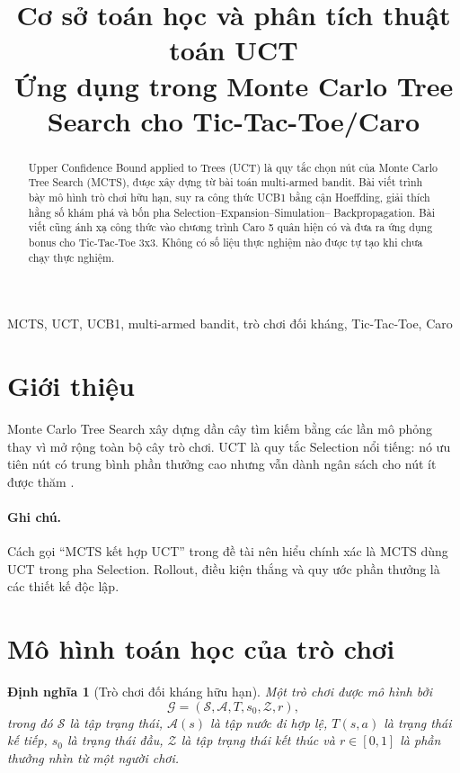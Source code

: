 \documentclass[conference]{IEEEtran}
\title{Cơ sở toán học và phân tích thuật toán UCT\\
\large Ứng dụng trong Monte Carlo Tree Search cho Tic-Tac-Toe/Caro}
\author{\IEEEauthorblockN{Tên sinh viên}
\IEEEauthorblockA{Bộ môn Trí tuệ nhân tạo\\
Trường/Đơn vị công tác}}
\newtheorem{definition}{Định nghĩa}[section]
\begin{document}
\maketitle
\begin{abstract}
Upper Confidence Bound applied to Trees (UCT) là quy tắc chọn nút của Monte
Carlo Tree Search (MCTS), được xây dựng từ bài toán multi-armed bandit. Bài viết
trình bày mô hình trò chơi hữu hạn, suy ra công thức UCB1 bằng cận Hoeffding,
giải thích hằng số khám phá và bốn pha Selection--Expansion--Simulation--
Backpropagation. Bài viết cũng ánh xạ công thức vào chương trình Caro 5 quân
hiện có và đưa ra ứng dụng bonus cho Tic-Tac-Toe 3x3. Không có số liệu thực
nghiệm nào được tự tạo khi chưa chạy thực nghiệm.
\end{abstract}
\begin{IEEEkeywords}
MCTS, UCT, UCB1, multi-armed bandit, trò chơi đối kháng, Tic-Tac-Toe, Caro
\end{IEEEkeywords}

\section{Giới thiệu}
Monte Carlo Tree Search xây dựng dần cây tìm kiếm bằng các lần mô phỏng thay vì
mở rộng toàn bộ cây trò chơi. UCT là quy tắc Selection nổi tiếng: nó ưu tiên nút
có trung bình phần thưởng cao nhưng vẫn dành ngân sách cho nút ít được thăm
\cite{kocsis2006}.

\paragraph{Ghi chú.} Cách gọi ``MCTS kết hợp UCT'' trong đề tài nên hiểu chính
xác là MCTS dùng UCT trong pha Selection. Rollout, điều kiện thắng và quy ước
phần thưởng là các thiết kế độc lập.

\section{Mô hình toán học của trò chơi}
\begin{definition}[Trò chơi đối kháng hữu hạn]
Một trò chơi được mô hình bởi
\[
\mathcal G=(\mathcal S,\mathcal A,T,s_0,\mathcal Z,r),
\]
trong đó $\mathcal S$ là tập trạng thái, $\mathcal A(s)$ là tập nước đi hợp lệ,
$T(s,a)$ là trạng thái kế tiếp, $s_0$ là trạng thái đầu, $\mathcal Z$ là tập
trạng thái kết thúc và $r\in[0,1]$ là phần thưởng nhìn từ một người chơi.
\end{definition}
\end{document}
